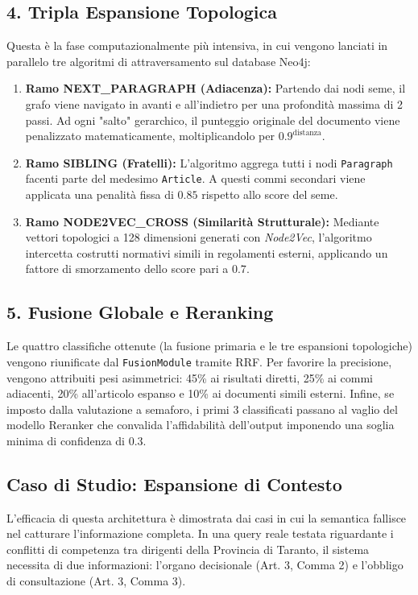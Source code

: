 \subsection{4. Tripla Espansione Topologica}
Questa è la fase computazionalmente più intensiva, in cui vengono lanciati in parallelo tre algoritmi di attraversamento sul database Neo4j:
\begin{enumerate}
    \item \textbf{Ramo NEXT\_PARAGRAPH (Adiacenza):} Partendo dai nodi seme, il grafo viene navigato in avanti e all'indietro per una profondità massima di 2 passi. Ad ogni "salto" gerarchico, il punteggio originale del documento viene penalizzato matematicamente, moltiplicandolo per $0.9^\text{distanza}$.
    \item \textbf{Ramo SIBLING (Fratelli):} L'algoritmo aggrega tutti i nodi \texttt{Paragraph} facenti parte del medesimo \texttt{Article}. A questi commi secondari viene applicata una penalità fissa di $0.85$ rispetto allo score del seme.
    \item \textbf{Ramo NODE2VEC\_CROSS (Similarità Strutturale):} Mediante vettori topologici a 128 dimensioni generati con \textit{Node2Vec}, l'algoritmo intercetta costrutti normativi simili in regolamenti esterni, applicando un fattore di smorzamento dello score pari a $0.7$.
\end{enumerate}

\subsection{5. Fusione Globale e Reranking}
Le quattro classifiche ottenute (la fusione primaria e le tre espansioni topologiche) vengono riunificate dal \texttt{FusionModule} tramite RRF. Per favorire la precisione, vengono attribuiti pesi asimmetrici: 45\% ai risultati diretti, 25\% ai commi adiacenti, 20\% all'articolo espanso e 10\% ai documenti simili esterni. Infine, se imposto dalla valutazione a semaforo, i primi 3 classificati passano al vaglio del modello Reranker che convalida l'affidabilità dell'output imponendo una soglia minima di confidenza di $0.3$.

\subsection{Caso di Studio: Espansione di Contesto}
L'efficacia di questa architettura è dimostrata dai casi in cui la semantica fallisce nel catturare l'informazione completa. In una query reale testata riguardante i conflitti di competenza tra dirigenti della Provincia di Taranto, il sistema necessita di due informazioni: l'organo decisionale (Art. 3, Comma 2) e l'obbligo di consultazione (Art. 3, Comma 3). 


